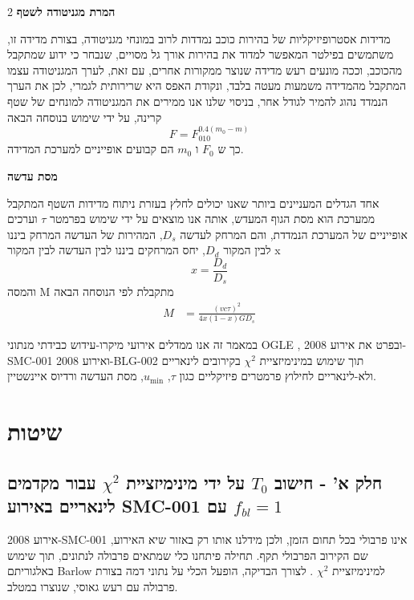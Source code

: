 \documentclass{article}
\begin{document}
\begin{multicols}{2}
\textbf{המרת מגניטודה לשטף}

מדידות אסטרופיזיקליות של בהירות כוכב נמדדות לרוב במונחי מגניטודה, בצורת מדידה זו, משתמשים בפילטר המאפשר למדוד את בהירות אורך גל מסויים, שנבחר כי ידוע שמתקבל מהכוכב, וככה מונעים רעש מדידה שנוצר ממקורות אחרים, עם זאת, לערך המגניטודה עצמו המתקבל מהמדידה משמעות מעטה בלבד, ונקודת האפס היא שרירותית לגמרי, לכן את הערך הנמדד נהוג להמיר לגודל אחר, בניסוי שלנו אנו ממירים את המגניטודה למונחים של שטף קרינה, על ידי שימוש בנוסחה הבאה
\begin{equation}
    F = F_010^{0.4(m_0-m)}
    \label{eq:trans_m_to_I}
\end{equation}
כך ש $F_0$ ו $m_0$ הם קבועים אופייניים למערכת המדידה.

\textbf{ מסת עדשה}

אחד הגדלים המעניינים ביותר שאנו יכולים לחלץ בעזרת ניתוח מדידות השטף המתקבל ממערכת הוא מסת הגוף המעדש, אותה אנו מוצאים על ידי שימוש בפרמטר $\tau$ וערכים אופייניים של המערכת הנמדדת, והם המרחק לעדשה $D_s$, המהירות של העדשה 
המרחק ביננו לבין המקור $D_d$, יחס המרחקים ביננו לבין העדשה לבין המקור x
\begin{equation}
    x = \frac{D_d}{D_s}
\end{equation}
והמסה M מתקבלת לפי הנוסחה הבאה
\begin{align}
    M&= \frac{(vc\tau)^2}{4x(1-x)GD_s} 
    \label{eq:lens_mass}
\end{align}
    


במאמר זה אנו ממדלים אירועי מיקרו-עידוש כבידתי מנתוני
OGLE
, 
ובפרט את אירוע
\mbox{2008-SMC-001}
ואירוע
\mbox{2008-BLG-002}
תוך שימוש במינימיזציית $\chi^2$ בקירובים לינאריים ולא-לינאריים לחילוץ פרמטרים פיזיקליים כגון $\tau$, $u_{\min}$, מסת העדשה ורדיוס איינשטיין.


\section{שיטות}
\subsection{חלק א'
- 
חישוב
$T_0$
על ידי מינימיזציית 
$\chi^2$ 
עבור מקדמים לינאריים
באירוע 
SMC-001
עם
$f_{bl}=1$
}

אירוע
2008-SMC-001
אינו פרבולי בכל תחום הזמן, ולכן מידלנו אותו רק באזור שיא האירוע, שם הקירוב הפרבולי תקף.
תחילה פיתחנו כלי שמתאים פרבולה לנתונים, תוך שימוש 
באלגוריתם
\textenglish{Barlow}
למינימיזציית
$\chi^2$
\cite{barlowbook}.
לצורך הבדיקה, הופעל הכלי על נתוני דמה בצורת פרבולה עם רעש גאוסי, שנוצרו במטלב.


\end{multicols}
\end{document}
